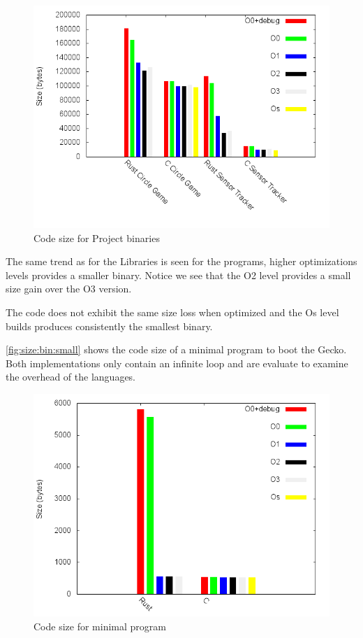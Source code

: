 \begin{figure}[H]
  \begin{center}
    \includegraphics[scale=0.5]{results/plots/size/bin/large/size.png}
  \end{center}
  \caption{Code size for Project binaries}
  \label{fig:size:bin:large}
\end{figure}

The same trend as for the Libraries is seen for the {\rust} programs, higher optimizations levels provides a smaller binary.
Notice we see that the O2 level provides a small size gain over the O3 version.

The {\C} code does not exhibit the same size loss when optimized and the Os level builds produces consistently the smallest binary.

\autoref{fig:size:bin:small} shows the code size of a minimal program to boot the Gecko.
Both implementations only contain an infinite loop and are evaluate to examine the overhead of the languages.

\begin{figure}[H]
  \begin{center}
    \includegraphics[scale=0.5]{results/plots/size/bin/small/size.png}
  \end{center}
  \caption{Code size for minimal program}
  \label{fig:size:bin:small}
\end{figure}

